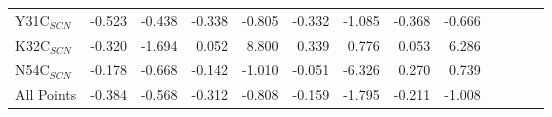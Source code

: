 \documentclass[landscape]{article}
\begin{document}
{\begin{tabular}{ l || r r | r r | r r | r r| r r | r r}
Y31C$_{SCN}$   & -0.523         & -0.438         & -0.338         & -0.805         & -0.332         & -1.085         & -0.368         & -0.666        \\
K32C$_{SCN}$   & -0.320         & -1.694         & 0.052          & 8.800          & 0.339          & 0.776          & 0.053          & 6.286         \\
N54C$_{SCN}$   & -0.178         & -0.668         & -0.142         & -1.010         & -0.051         & -6.326         & 0.270          & 0.739         \\
\hline
All Points     & -0.384         & -0.568         & -0.312         & -0.808         & -0.159         & -1.795         & -0.211         & -1.008        \\
\end{tabular}\\
}\\
\end{document}
